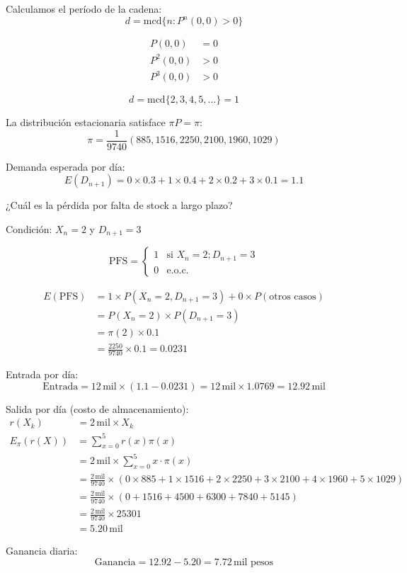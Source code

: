 \documentclass[12pt,a4paper]{article}
\begin{document}
Calculamos el período de la cadena:
\begin{equation*}
d = \text{mcd} \{n: P^n(0,0) > 0\}
\end{equation*}

\begin{align*}
P(0,0) &= 0 \\
P^2(0,0) &> 0 \\
P^3(0,0) &> 0
\end{align*}

\begin{equation*}
d = \text{mcd} \{2,3,4,5,\dots\} = 1
\end{equation*}

La distribución estacionaria satisface $\pi P = \pi$:
\begin{equation*}
\pi = \frac{1}{9740} (885, 1516, 2250, 2100, 1960, 1029)
\end{equation*}

Demanda esperada por día:
\begin{equation*}
E(D_{n+1}) = 0 \times 0.3 + 1 \times 0.4 + 2 \times 0.2 + 3 \times 0.1 = 1.1
\end{equation*}

¿Cuál es la pérdida por falta de stock a largo plazo?

Condición: $X_n = 2$ y $D_{n+1} = 3$

\begin{equation*}
\text{PFS} = \begin{cases}
1 & \text{si } X_n = 2; D_{n+1} = 3 \\
0 & \text{e.o.c.}
\end{cases}
\end{equation*}

\begin{align*}
E(\text{PFS}) &= 1 \times P(X_n = 2, D_{n+1} = 3) + 0 \times P(\text{otros casos}) \\
&= P(X_n = 2) \times P(D_{n+1} = 3) \\
&= \pi(2) \times 0.1 \\
&= \frac{2250}{9740} \times 0.1 = 0.0231
\end{align*}

Entrada por día:
\begin{equation*}
\text{Entrada} = 12\,\text{mil} \times (1.1 - 0.0231) = 12\,\text{mil} \times 1.0769 = 12.92\,\text{mil}
\end{equation*}

Salida por día (costo de almacenamiento):
\begin{align*}
r(X_k) &= 2\,\text{mil} \times X_k \\
E_{\pi}(r(X)) &= \sum_{x=0}^{5} r(x) \pi(x) \\
&= 2\,\text{mil} \times \sum_{x=0}^{5} x \cdot \pi(x) \\
&= \frac{2\,\text{mil}}{9740} \times (0 \times 885 + 1 \times 1516 + 2 \times 2250 + 3 \times 2100 + 4 \times 1960 + 5 \times 1029) \\
&= \frac{2\,\text{mil}}{9740} \times (0 + 1516 + 4500 + 6300 + 7840 + 5145) \\
&= \frac{2\,\text{mil}}{9740} \times 25301 \\
&= 5.20\,\text{mil}
\end{align*}

Ganancia diaria:
\begin{equation*}
\text{Ganancia} = 12.92 - 5.20 = 7.72\,\text{mil pesos}
\end{equation*}
\end{document}

